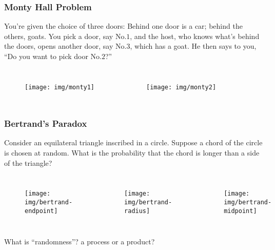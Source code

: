 \documentclass[UTF8,11pt,colorlinks,compress,openany]{beamer}%
\begin{document}
\begin{frame}\frametitle{Monty Hall Problem}
	\begin{problem}
		You're given the choice of three doors: Behind one door is a car; behind the others, goats. You pick a door, say No.$1$, and the host, who knows what's behind the doors, opens another door, say No.$3$, which has a goat. He then says to you, ``Do you want to pick door No.$2$?''
	\end{problem}
	\begin{columns}
			\begin{figure}
				\texttt{[image: img/monty1]}
			\end{figure}
			\begin{figure}
				\texttt{[image: img/monty2]}
			\end{figure}
	\end{columns}
\end{frame}

\begin{frame}\frametitle{Bertrand's Paradox}
	\begin{problem}
		Consider an equilateral triangle inscribed in a circle. Suppose a chord of the circle is chosen at random. What is the probability that the chord is longer than a side of the triangle?
	\end{problem}
	\begin{columns}
		\column{0.3\textwidth}
			\begin{figure}
				\texttt{[image: img/bertrand-endpoint]}
			\end{figure}
		\column{0.3\textwidth}
			\begin{figure}
				\texttt{[image: img/bertrand-radius]}
			\end{figure}
		\column{0.3\textwidth}
			\begin{figure}
				\texttt{[image: img/bertrand-midpoint]}
			\end{figure}
	\end{columns}
	\begin{center}
		What is ``randomness''? a process or a product?
	\end{center}
\end{frame}
\end{document}
